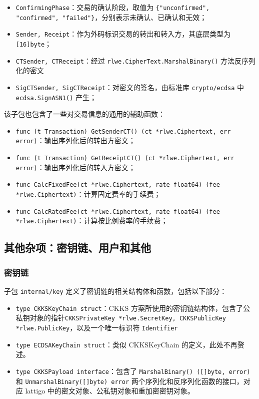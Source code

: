 \begin{itemize}
    \item \verb|ConfirmingPhase|：交易的确认阶段，取值为 \verb|{"unconfirmed", "confirmed", "failed"}|，分别表示未确认、已确认和无效；
    \item \verb|Sender, Receipt|：作为外码标识交易的转出和转入方，其底层类型为 \verb|[16]byte|；
    \item \verb|CTSender, CTReceipt|：经过 \verb|rlwe.CipherText.MarshalBinary()| 方法反序列化的密文
    \item \verb|SigCTSender, SigCTReceipt|：对密文的签名，由标准库 \verb|crypto/ecdsa| 中 \verb|ecdsa.SignASN1()| 产生；
\end{itemize}

该子包也包含了一些对交易信息的通用的辅助函数：

\begin{itemize}
    \item \verb|func (t Transaction) GetSenderCT() (ct *rlwe.Ciphertext, err error)|：输出序列化后的转出方密文；
    \item \verb|func (t Transaction) GetReceiptCT() (ct *rlwe.Ciphertext, err error)|：输出序列化后的转入方密文；
    \item \verb|func CalcFixedFee(ct *rlwe.Ciphertext, rate float64) (fee *rlwe.Ciphertext)|：计算固定费率的手续费；
    \item \verb|func CalcRatedFee(ct *rlwe.Ciphertext, rate float64) (fee *rlwe.Ciphertext)|：计算按比例费率的手续费；
\end{itemize}

\subsection{其他杂项：密钥链、用户和其他}

\subsubsection*{密钥链}

子包 \verb|internal/key| 定义了密钥链的相关结构体和函数，包括以下部分：

\begin{itemize}
    \item \verb|type CKKSKeyChain struct|：CKKS 方案所使用的密钥链结构体，包含了公私钥对象的指针\verb|CKKSPrivateKey *rlwe.SecretKey, CKKSPublicKey  *rlwe.PublicKey|，以及一个唯一标识符 \verb|Identifier|
    \item \verb|type ECDSAKeyChain struct|：类似 CKKSKeyChain 的定义，此处不再赘述。
    \item \verb|type CKKSPayload interface|：包含了 \verb|MarshalBinary() ([]byte, error)| 和 \verb|UnmarshalBinary([]byte) error| 两个序列化和反序列化函数的接口，对应 lattigo 中的密文对象、公私钥对象和重加密密钥对象。
\end{itemize}

